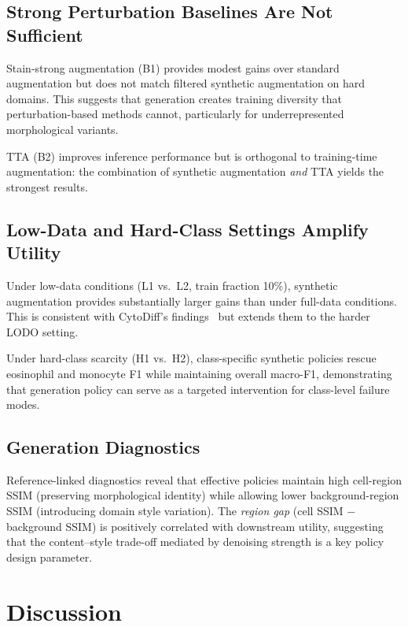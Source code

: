 \documentclass[10pt,twocolumn]{article}
\begin{document}
\subsection{Strong Perturbation Baselines Are Not Sufficient}

Stain-strong augmentation (B1) provides modest gains over standard
augmentation but does not match filtered synthetic augmentation on hard
domains. This suggests that generation creates training diversity that
perturbation-based methods cannot, particularly for underrepresented
morphological variants.

TTA (B2) improves inference performance but is orthogonal to
training-time augmentation: the combination of synthetic augmentation
\emph{and} TTA yields the strongest results.

\subsection{Low-Data and Hard-Class Settings Amplify Utility}

Under low-data conditions (L1 vs.\ L2, train fraction 10\%), synthetic
augmentation provides substantially larger gains than under full-data
conditions. This is consistent with CytoDiff's
findings~\citep{Boada_2025} but extends them to the harder LODO setting.

Under hard-class scarcity (H1 vs.\ H2), class-specific synthetic
policies rescue eosinophil and monocyte F1 while maintaining overall
macro-F1, demonstrating that generation policy can serve as a targeted
intervention for class-level failure modes.

\subsection{Generation Diagnostics}

Reference-linked diagnostics reveal that effective policies maintain high
cell-region SSIM (preserving morphological identity) while allowing lower
background-region SSIM (introducing domain style variation). The
\emph{region gap} (cell SSIM $-$ background SSIM) is positively
correlated with downstream utility, suggesting that the
content--style trade-off mediated by denoising strength is a key policy
design parameter.

\section{Discussion}
\label{sec:discussion}
\end{document}
